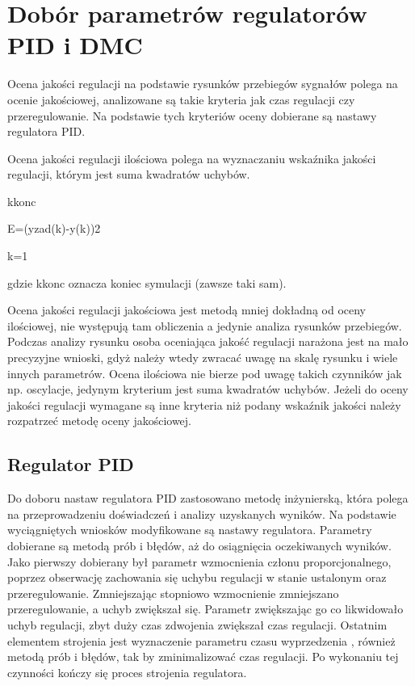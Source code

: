\section{Dobór parametrów regulatorów PID i DMC}
Ocena jakości regulacji na podstawie rysunków przebiegów sygnałów polega na ocenie jakościowej, 
analizowane są takie kryteria jak czas regulacji czy przeregulowanie. 
Na podstawie tych kryteriów oceny dobierane są nastawy regulatora PID.

Ocena jakości regulacji ilościowa polega na wyznaczaniu wskaźnika jakości regulacji, 
którym jest suma kwadratów uchybów. 


kkonc

E=(yzad(k)-y(k))2

k=1

gdzie kkonc oznacza koniec symulacji (zawsze taki sam). 

Ocena jakości regulacji jakościowa jest metodą mniej dokładną od oceny ilościowej, 
nie występują tam obliczenia a jedynie analiza rysunków przebiegów. 
Podczas analizy rysunku osoba oceniająca jakość regulacji narażona jest na mało precyzyjne wnioski, 
gdyż należy wtedy zwracać uwagę na skalę rysunku i wiele innych parametrów. 
Ocena ilościowa nie bierze pod uwagę takich czynników jak np. oscylacje, 
jedynym kryterium jest suma kwadratów uchybów. 
Jeżeli do oceny jakości regulacji wymagane są inne kryteria niż podany wskaźnik jakości 
należy rozpatrzeć metodę oceny jakościowej.

\subsection{Regulator PID}

Do doboru nastaw regulatora PID zastosowano metodę inżynierską, 
która polega na przeprowadzeniu doświadczeń i analizy uzyskanych wyników. 
Na podstawie wyciągniętych wniosków modyfikowane są nastawy regulatora. 
Parametry  dobierane są metodą prób i błędów, aż do osiągnięcia oczekiwanych wyników. 
Jako pierwszy dobierany był parametr wzmocnienia członu proporcjonalnego, 
poprzez obserwację zachowania się uchybu regulacji w stanie ustalonym oraz przeregulowanie. 
Zmniejszając stopniowo wzmocnienie zmniejszano przeregulowanie, a uchyb zwiększał się. 
Parametr  zwiększając go co likwidowało uchyb regulacji,  
zbyt duży czas zdwojenia zwiększał czas regulacji. 
Ostatnim elementem strojenia jest wyznaczenie parametru czasu wyprzedzenia , 
również metodą prób i błędów, tak by zminimalizować czas regulacji. 
Po wykonaniu tej czynności kończy się proces strojenia regulatora.


